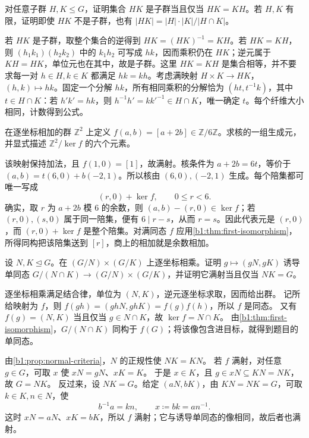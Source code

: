 \begin{exercise}\label{b1:ex:02-product-subgroups}
	对任意子群 \(H,K\leq G\)，证明集合 \(HK\) 是子群当且仅当 \(HK=KH\)。若 \(H,K\) 有限，证明即使 \(HK\) 不是子群，也有 \(\lvert HK\rvert=\lvert H\rvert\cdot\lvert K\rvert/\lvert H\cap K\rvert\)。
\end{exercise}
\begin{solution}
	若 \(HK\) 是子群，取整个集合的逆得到 \(HK=(HK)^{-1}=KH\)。若 \(HK=KH\)，则 \((h_1k_1)(h_2k_2)\) 中的 \(k_1h_2\) 可写成 \(hk\)，因而乘积仍在 \(HK\)；逆元属于 \(KH=HK\)，单位元也在其中，故是子群。这里 \(HK=KH\) 是集合相等，并不要求每一对 \(h\in H,k\in K\) 都满足 \(hk=kh\)。考虑满映射 \(H\times K\rightarrow HK\)，\((h,k)\mapsto hk\)。固定一个分解 \(hk\)，所有相同乘积的分解恰为 \((ht,t^{-1}k)\)，其中 \(t\in H\cap K\)：若 \(h'k'=hk\)，则 \(h^{-1}h'=kk'^{-1}\in H\cap K\)，唯一确定 \(t\)。每个纤维大小相同，计数得到公式。
\end{solution}

\begin{exercise}\label{b1:ex:02-lattice-kernel}
	在逐坐标相加的群 \(\mathbb Z^2\) 上定义 \(f(a,b)=[a+2b]\in\mathbb Z/6\mathbb Z\)。求核的一组生成元，并显式描述 \(\mathbb Z^2/\ker f\) 的六个元素。
\end{exercise}
\begin{solution}
	该映射保持加法，且 \(f(1,0)=[1]\)，故满射。核条件为 \(a+2b=6t\)，等价于 \((a,b)=t(6,0)+b(-2,1)\)。所以核由 \((6,0),(-2,1)\) 生成。每个陪集都可唯一写成
	\[
		(r,0)+\ker f,\qquad 0\leq r<6.
	\]
	确实，取 \(r\) 为 \(a+2b\) 模 \(6\) 的余数，则 \((a,b)-(r,0)\in\ker f\)；若 \((r,0),(s,0)\) 属于同一陪集，便有 \(6\mid r-s\)，从而 \(r=s\)。因此代表元是 \((r,0)\)，而 \((r,0)+\ker f\) 是整个陪集。对满同态 \(f\) 应用\cref{b1:thm:first-isomorphism}，所得同构把该陪集送到 \([r]\)，商上的相加就是余数相加。
\end{solution}

\begin{exercise}\label{b1:ex:02-two-quotients}
	设 \(N,K\trianglelefteq G\)。在 \((G/N)\times(G/K)\) 上逐坐标相乘。证明 \(g\mapsto(gN,gK)\) 诱导单同态 \(G/(N\cap K)\rightarrow(G/N)\times(G/K)\)，并证明它满射当且仅当 \(NK=G\)。
\end{exercise}
\begin{solution}
	逐坐标相乘满足结合律，单位为 \((N,K)\)，逆元逐坐标求取，因而给出群。 记所给映射为 \(f\)，则 \(f(gh)=(ghN,ghK)=f(g)f(h)\)，所以 \(f\) 是同态。 又有 \(f(g)=(N,K)\) 当且仅当 \(g\in N\cap K\)，故 \(\ker f=N\cap K\)。 由\cref{b1:thm:first-isomorphism}，\(G/(N\cap K)\) 同构于 \(f(G)\)；将该像包含进目标，就得到题目的单同态。

	由\cref{b1:prop:normal-criteria}，\(N\) 的正规性使 \(NK=KN\)。 若 \(f\) 满射，对任意 \(g\in G\)，可取 \(x\) 使 \(xN=gN\)、\(xK=K\)。 于是 \(x\in K\)，且 \(g\in xN\subseteq KN=NK\)，故 \(G=NK\)。 反过来，设 \(NK=G\)。给定 \((aN,bK)\)，由 \(KN=NK=G\)，可取 \(k\in K,n\in N\)，使
	\[
		b^{-1}a=kn,\qquad x\coloneqq bk=an^{-1}.
	\]
	这时 \(xN=aN\)、\(xK=bK\)，所以 \(f\) 满射；它与诱导单同态的像相同，故后者也满射。
\end{solution}

